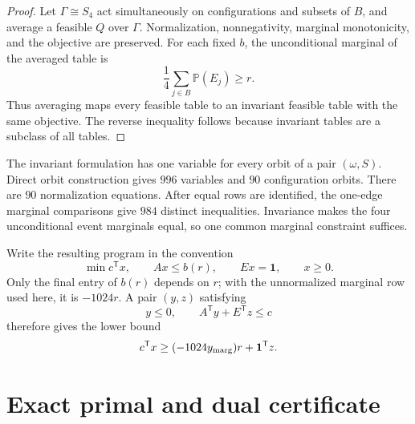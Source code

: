 \documentclass[11pt]{article}
\newcommand{\Prob}{\mathbb P}
\begin{document}
\begin{proof}
Let $\Gamma\cong S_4$ act simultaneously on configurations and subsets of
$B$, and average a feasible $Q$ over $\Gamma$.  Normalization,
nonnegativity, marginal monotonicity, and the objective are preserved.  For
each fixed $b$, the unconditional marginal of the averaged table is
\[
 \frac14\sum_{j\in B}\Prob(E_j)\geq r.
\]
Thus averaging maps every feasible table to an invariant feasible table with
the same objective.  The reverse inequality follows because invariant tables
are a subclass of all tables.
\end{proof}

The invariant formulation has one variable for every orbit of a pair
$(\omega,S)$.  Direct orbit construction gives $996$ variables and $90$
configuration orbits.  There are $90$ normalization equations.  After equal
rows are identified, the one-edge marginal comparisons give $984$ distinct
inequalities.  Invariance makes the four unconditional event marginals equal,
so one common marginal constraint suffices.

Write the resulting program in the convention
\begin{equation}\label{eq:LP}
 \min c^{\mathsf T}x,\qquad Ax\leq b(r),\qquad Ex=\mathbf1,
 \qquad x\geq0.
\end{equation}
Only the final entry of $b(r)$ depends on $r$; with the unnormalized marginal
row used here, it is $-1024r$.  A pair $(y,z)$ satisfying
\begin{equation}\label{eq:dualfeas}
 y\leq0,\qquad A^{\mathsf T}y+E^{\mathsf T}z\leq c
\end{equation}
therefore gives the lower bound
\begin{equation}\label{eq:dualbound}
 c^{\mathsf T}x\geq(-1024y_{\rm marg})r+\mathbf1^{\mathsf T}z.
\end{equation}

\section{Exact primal and dual certificate}
\end{document}
